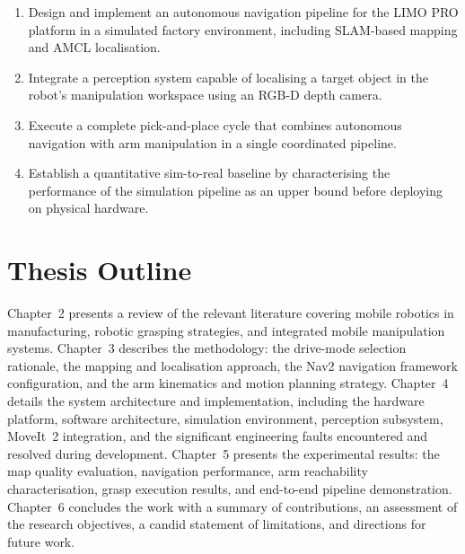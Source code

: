 \begin{enumerate}
    \item Design and implement an autonomous navigation pipeline for the LIMO PRO
    platform in a simulated factory environment, including SLAM-based mapping and
    AMCL localisation.
    \item Integrate a perception system capable of localising a target object in the
    robot's manipulation workspace using an RGB-D depth camera.
    \item Execute a complete pick-and-place cycle that combines autonomous navigation
    with arm manipulation in a single coordinated pipeline.
    \item Establish a quantitative sim-to-real baseline by characterising the
    performance of the simulation pipeline as an upper bound before deploying on
    physical hardware.
\end{enumerate}

\section{Thesis Outline}
Chapter~2 presents a review of the relevant literature covering mobile robotics in
manufacturing, robotic grasping strategies, and integrated mobile manipulation systems.
Chapter~3 describes the methodology: the drive-mode selection rationale, the mapping
and localisation approach, the Nav2 navigation framework configuration, and the arm
kinematics and motion planning strategy. Chapter~4 details the system architecture and
implementation, including the hardware platform, software architecture, simulation
environment, perception subsystem, MoveIt~2 integration, and the significant
engineering faults encountered and resolved during development. Chapter~5 presents the
experimental results: the map quality evaluation, navigation performance, arm
reachability characterisation, grasp execution results, and end-to-end pipeline
demonstration. Chapter~6 concludes the work with a summary of contributions, an
assessment of the research objectives, a candid statement of limitations, and directions
for future work.
